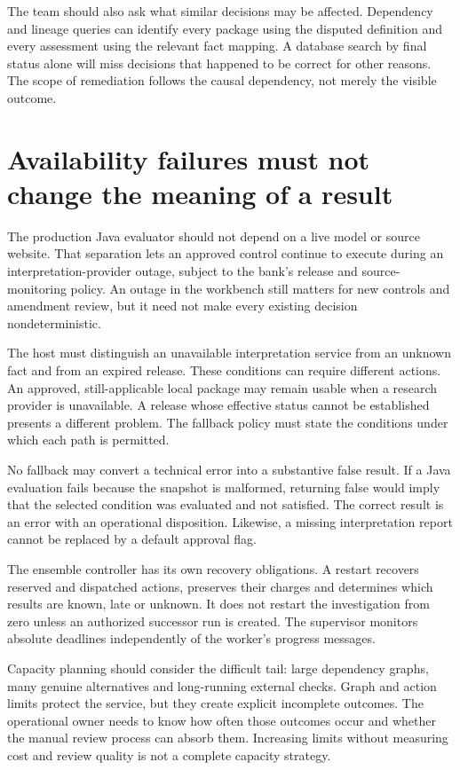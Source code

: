 \documentclass[12pt,a4paper,oneside,openany]{book}
\begin{document}
The team should also ask what similar decisions may be affected. Dependency and
lineage queries can identify every package using the disputed definition and
every assessment using the relevant fact mapping. A database search by final
status alone will miss decisions that happened to be correct for other reasons.
The scope of remediation follows the causal dependency, not merely the visible
outcome.

\section{Availability failures must not change the meaning of a result}

The production Java evaluator should not depend on a live model or source website.
That separation lets an approved control continue to execute during an
interpretation-provider outage, subject to the bank's release and source-monitoring
policy. An outage in the workbench still matters for new controls and amendment
review, but it need not make every existing decision nondeterministic.

The host must distinguish an unavailable interpretation service from an unknown
fact and from an expired release. These conditions can require different actions.
An approved, still-applicable local package may remain usable when a research
provider is unavailable. A release whose effective status cannot be established
presents a different problem. The fallback policy must state the conditions under
which each path is permitted.

No fallback may convert a technical error into a substantive false result. If a
Java evaluation fails because the snapshot is malformed, returning false would
imply that the selected condition was evaluated and not satisfied. The correct
result is an error with an operational disposition. Likewise, a missing
interpretation report cannot be replaced by a default approval flag.

The ensemble controller has its own recovery obligations. A restart recovers
reserved and dispatched actions, preserves their charges and determines which
results are known, late or unknown. It does not restart the investigation from
zero unless an authorized successor run is created. The supervisor monitors
absolute deadlines independently of the worker's progress messages.

Capacity planning should consider the difficult tail: large dependency graphs,
many genuine alternatives and long-running external checks. Graph and action
limits protect the service, but they create explicit incomplete outcomes. The
operational owner needs to know how often those outcomes occur and whether the
manual review process can absorb them. Increasing limits without measuring cost
and review quality is not a complete capacity strategy.
\end{document}
